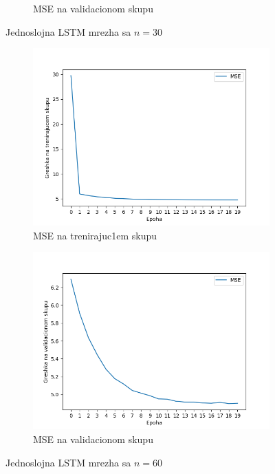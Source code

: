 \documentclass[a4paper, openany, oneside, 11pt]{book}
\begin{document}
\begin{figure}[!h]
\begin{subfigure}{0.475\textwidth}
            \caption{\acrshort{MSE} na validacionom skupu}
            \label{fig:4_1b}
            \vspace{0pt}
        \end{subfigure}
        \caption{Jednoslojna \acrshort{LSTM} mrezha sa $n=30$}
        \label{fig:4_1}
\end{figure}
\begin{figure}[!h]
        \centering
        \begin{subfigure}{0.475\textwidth}
            \centering
            \includegraphics[scale=0.45]{res/SingleLayerLSTM_60units_train.png}
            \caption{\acrshort{MSE} na trenirajuc1em skupu}
            \label{fig:4_2a}
            \vspace{0pt}
        \end{subfigure}%
        \begin{subfigure}{0.475\textwidth}
            \centering
            \includegraphics[scale=0.45]{res/SingleLayerLSTM_60units_validation.png}
            \caption{\acrshort{MSE} na validacionom skupu}
            \label{fig:4_2b}
            \vspace{0pt}
        \end{subfigure}
        \caption{Jednoslojna \acrshort{LSTM} mrezha sa $n=60$}
        \label{fig:4_2}
\end{figure}
\end{document}
